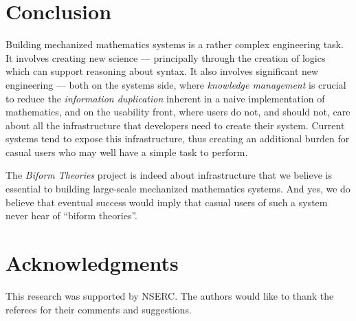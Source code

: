 \documentclass[fleqn]{llncs}
\begin{document}
\section{Conclusion}

Building mechanized mathematics systems is a rather complex engineering
task. It involves creating new science --- principally through the creation
of logics which can support reasoning about syntax.  It also involves significant
new engineering --- both on the systems side, where \emph{knowledge management}
is crucial to reduce the \emph{information duplication} inherent in a
naive implementation of mathematics, and on the usability front, where
users do not, and should not, care about all the infrastructure that 
developers need to create their system. Current systems tend to expose
this infrastructure, thus creating an additional burden for casual users
who may well have a simple task to perform.

The \emph{Biform Theories} project is indeed about infrastructure that
we believe is essential to building large-scale mechanized mathematics
systems. And yes, we do believe that eventual success would imply that
casual users of such a system never hear of ``biform theories''.

\section*{Acknowledgments} 

This research was supported by NSERC.  The authors would like to thank
the referees for their comments and suggestions.

%




\end{document}
